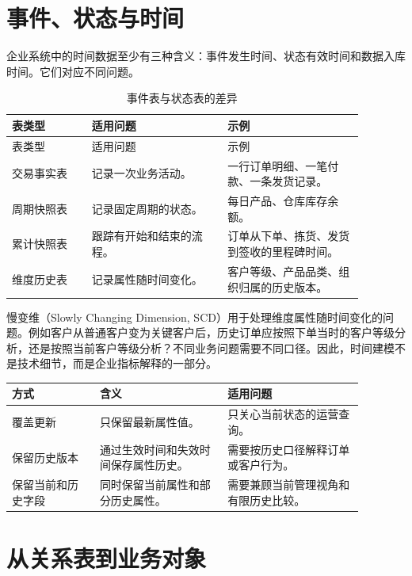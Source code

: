 \documentclass[UTF8,fontset=fandol,openany,zihao=-4]{ctexbook}
\begin{document}
\section{事件、状态与时间}

企业系统中的时间数据至少有三种含义：事件发生时间、状态有效时间和数据入库时间。它们对应不同问题。

\begin{longtable}{p{0.20\linewidth}p{0.34\linewidth}p{0.34\linewidth}}
\caption{事件表与状态表的差异}\\
\toprule
表类型 & 适用问题 & 示例\\
\midrule
\endfirsthead
\toprule
表类型 & 适用问题 & 示例\\
\midrule
\endhead
交易事实表 & 记录一次业务活动。 & 一行订单明细、一笔付款、一条发货记录。\\
周期快照表 & 记录固定周期的状态。 & 每日产品、仓库库存余额。\\
累计快照表 & 跟踪有开始和结束的流程。 & 订单从下单、拣货、发货到签收的里程碑时间。\\
维度历史表 & 记录属性随时间变化。 & 客户等级、产品品类、组织归属的历史版本。\\
\bottomrule
\end{longtable}

慢变维（Slowly Changing Dimension, SCD）用于处理维度属性随时间变化的问题。例如客户从普通客户变为关键客户后，历史订单应按照下单当时的客户等级分析，还是按照当前客户等级分析？不同业务问题需要不同口径。因此，时间建模不是技术细节，而是企业指标解释的一部分。

\begin{center}
\captionsetup{type=table,hypcap=false}
\caption{慢变维的常见处理方式}
\begin{tabular}{p{0.22\linewidth}p{0.32\linewidth}p{0.34\linewidth}}
\toprule
方式 & 含义 & 适用问题\\
\midrule
覆盖更新 & 只保留最新属性值。 & 只关心当前状态的运营查询。\\
保留历史版本 & 通过生效时间和失效时间保存属性历史。 & 需要按历史口径解释订单或客户行为。\\
保留当前和历史字段 & 同时保留当前属性和部分历史属性。 & 需要兼顾当前管理视角和有限历史比较。\\
\bottomrule
\end{tabular}
\end{center}

\section{从关系表到业务对象}
\end{document}
